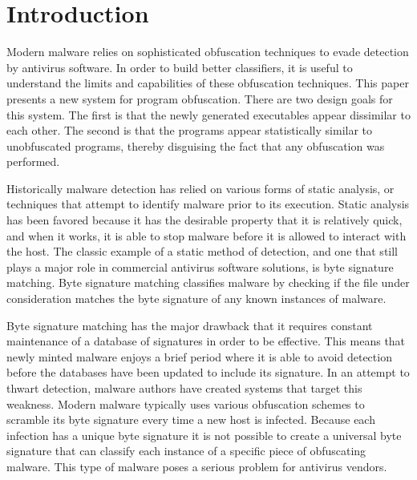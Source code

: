 \chapter{Introduction}

    Modern malware relies on sophisticated obfuscation techniques to evade
    detection by antivirus software. In order to build better classifiers, it is
    useful to understand the limits and capabilities of these obfuscation
    techniques. This paper presents a new system for program obfuscation. There
    are two design goals for this system. The first is that the newly generated
    executables appear dissimilar to each other. The second is that the programs
    appear statistically similar to unobfuscated programs, thereby disguising
    the fact that any obfuscation was performed.




    Historically malware detection has relied on various forms of static
    analysis, or techniques that attempt to identify malware prior to its
    execution.  Static analysis has been favored because it has the desirable
    property that it is relatively quick, and when it works, it is able to stop
    malware before it is allowed to interact with the host. The classic example
    of a static method of detection, and one that still plays a major role in
    commercial antivirus software solutions, is byte signature matching.  Byte
    signature matching classifies malware by checking if the file under
    consideration matches the byte signature of any known instances of malware.


    Byte signature matching has the major drawback that it requires constant
    maintenance of a database of signatures in order to be effective. This means
    that newly minted malware enjoys a brief period where it is able to avoid
    detection before the databases have been updated to include its signature.
    In an attempt to thwart detection, malware authors have created systems that
    target this weakness. Modern malware typically uses various obfuscation
    schemes to scramble its byte signature every time a new host is infected.
    Because each infection has a unique byte signature it is not possible to
    create a universal byte signature that can classify each instance of a
    specific piece of obfuscating malware. This type of malware poses a serious
    problem for antivirus vendors.

